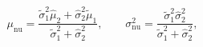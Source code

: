 \begin{equation}
  \mu_{\text{nu}} = \frac{
    \tilde{\sigma}^{2}_{1} \hat{\mu}_{2} + \hat{\sigma}^{2}_{2}\tilde{\mu}_{1}
  } {
    \tilde{\sigma}^{2}_{1} + \hat{\sigma}^{2}_{2}
  },
  \qquad
  \sigma^{2}_{\text{nu}} = \frac{
    \tilde{\sigma}^{2}_{1} \hat{\sigma}^{2}_{2}
  } {
    \tilde{\sigma}^{2}_{1} + \hat{\sigma}^{2}_{2}
  },
  \label{eqn:numerator-results}
\end{equation}